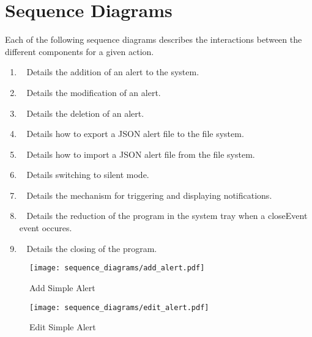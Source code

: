 \chapter{Sequence Diagrams}\label{ch:sequence_diagrams}
Each of the following sequence diagrams describes the interactions between the different components for a given action.

\begin{enumerate}
    \item~ Details the addition of an alert to
        the system.

    \item~ Details the modification of an
        alert.

    \item~ Details the deletion of an alert.

    \item~ Details how to export a JSON alert
        file to the file system.

    \item~ Details how to import a JSON alert
        file from the file system.

    \item~ Details switching to silent mode.

    \item~ Details the mechanism for triggering and
        displaying notifications.

    \item~ Details the reduction of the program
        in the system tray when a closeEvent event occures.

    \item~ Details the closing of the program.
\end{enumerate}

\begin{figure}[]
	\centering
    \caption{Add Simple Alert}\label{fig:sd_add_simple_alert}
    \texttt{[image: sequence\_diagrams/add\_alert.pdf]}
\end{figure}

\begin{figure}[]
	\centering
    \caption{Edit Simple Alert}\label{fig:sd_edit_simple_alert}
    \texttt{[image: sequence\_diagrams/edit\_alert.pdf]}
\end{figure}

